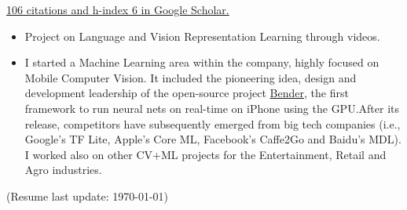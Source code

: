 \documentclass[10pt,a4paper,academicons]{altacv}
\newif\ifpublic{}
\begin{document}
\href{https://scholar.google.com/citations?user=i2LNBfUAAAAJ}{106 citations and h-index 6 in Google Scholar.}

\vspace{3mm}

\nocite{*}

\printbibliography[heading=pubtype,title={\printinfo{\faGroup}{Conference Proceedings}},type=inproceedings]

\printbibliography[heading=pubtype,title={\printinfo{\faGraduationCap}{Theses}},type=thesis]

\pagebreak


\printbibliography[heading=pubtype,title={\printinfo{\faGroup}{Workshop Proceedings}},type=incollection]

\printbibliography[heading=pubtype,title={\printinfo{\faAsterisk}{Non Refereed}},type=misc]



\begin{itemize}
  \item Project on Language and Vision Representation Learning through videos.
\end{itemize}

\divider{}


\begin{itemize}
  \item I started a Machine Learning area within the company, highly focused on Mobile Computer Vision. It included the pioneering idea, design and development leadership of the open-source project {\href{https://github.com/xmartlabs/Bender}{Bender}}, the first framework to run neural nets on real-time on iPhone using the GPU.\@ After its release, competitors have subsequently emerged from big tech companies (i.e., Google’s TF Lite, Apple’s Core ML, Facebook’s Caffe2Go and Baidu’s MDL). I worked also on other CV+ML projects for the Entertainment, Retail and Agro industries.
\end{itemize}

\divider{}


\pagebreak




\ifpublic{}
  Available upon request.
\else
  
\fi

\divider{}

(Resume last update: \today)
\end{document}
